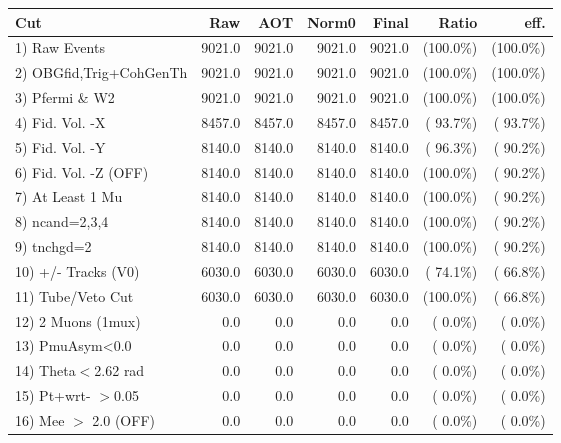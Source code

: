  \begin{table}[h!]\centering
 \begin{tabular}{||l||r|r|r|r|r|r||}
 \hline
 \hline
 Cut & Raw & AOT & Norm0 & Final & Ratio & eff.       \\
 \hline
  1) Raw Events           &       9021.0 &       9021.0 &       9021.0 &       9021.0 & (100.0\%) & (100.0\%) \\
  2) OBGfid,Trig+CohGenTh &       9021.0 &       9021.0 &       9021.0 &       9021.0 & (100.0\%) & (100.0\%) \\
  3) Pfermi \& W2         &       9021.0 &       9021.0 &       9021.0 &       9021.0 & (100.0\%) & (100.0\%) \\
  4) Fid. Vol. -X         &       8457.0 &       8457.0 &       8457.0 &       8457.0 & ( 93.7\%) & ( 93.7\%) \\
  5) Fid. Vol. -Y         &       8140.0 &       8140.0 &       8140.0 &       8140.0 & ( 96.3\%) & ( 90.2\%) \\
  6) Fid. Vol. -Z (OFF)   &       8140.0 &       8140.0 &       8140.0 &       8140.0 & (100.0\%) & ( 90.2\%) \\
  7) At Least 1 Mu        &       8140.0 &       8140.0 &       8140.0 &       8140.0 & (100.0\%) & ( 90.2\%) \\
  8) ncand=2,3,4          &       8140.0 &       8140.0 &       8140.0 &       8140.0 & (100.0\%) & ( 90.2\%) \\
  9) tnchgd=2             &       8140.0 &       8140.0 &       8140.0 &       8140.0 & (100.0\%) & ( 90.2\%) \\
 10) +/- Tracks (V0)      &       6030.0 &       6030.0 &       6030.0 &       6030.0 & ( 74.1\%) & ( 66.8\%) \\
 11) Tube/Veto Cut        &       6030.0 &       6030.0 &       6030.0 &       6030.0 & (100.0\%) & ( 66.8\%) \\
 12) 2 Muons (1mux)       &          0.0 &          0.0 &          0.0 &          0.0 & (  0.0\%) & (  0.0\%) \\
 13) PmuAsym<0.0          &          0.0 &          0.0 &          0.0 &          0.0 & (  0.0\%) & (  0.0\%) \\
 14) Theta$<$2.62 rad     &          0.0 &          0.0 &          0.0 &          0.0 & (  0.0\%) & (  0.0\%) \\
 15) Pt+wrt- $>$0.05      &          0.0 &          0.0 &          0.0 &          0.0 & (  0.0\%) & (  0.0\%) \\
 16) Mee $>$ 2.0  (OFF)   &          0.0 &          0.0 &          0.0 &          0.0 & (  0.0\%) & (  0.0\%) \\

\end{tabular}
\end{table}
